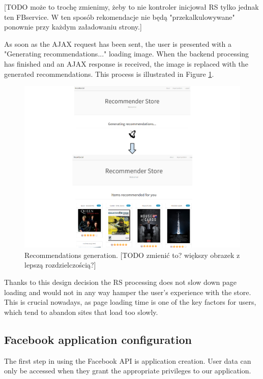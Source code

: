 \documentclass[12pt]{report}
\begin{document}
[TODO może to trochę zmienimy, żeby to nie kontroler inicjował RS tylko jednak ten FBservice. W ten sposób rekomendacje nie będą "przekalkulowywane" ponownie przy każdym załadowaniu strony.]

As soon as the AJAX request has been sent, the user is presented with a "Generating recommendations..." loading image. When the backend processing has finished and an AJAX response is received, the image is replaced with the generated recommendations. This process is illustrated in Figure \ref{fig.reco_gen_done}.

\begin{figure}[!t]
\centering
\includegraphics[width=\textwidth]{reco_gen_done.png} 
\caption[Recommendations generation.]{Recommendations generation. [TODO zmienić to? większy obrazek z lepszą rozdzielczością?]}
\label{fig.reco_gen_done}
\end{figure}

\hbox{}
Thanks to this design decision the RS processing does not slow down page loading and would not in any way hamper the user's experience with the store. This is crucial nowadays, as page loading time is one of the key factors for users, which tend to abandon sites that load too slowly.

\subsection{Facebook application configuration}
The first step in using the Facebook API is application creation. User data can only be accessed when they grant the appropriate privileges to our application.
\end{document}
